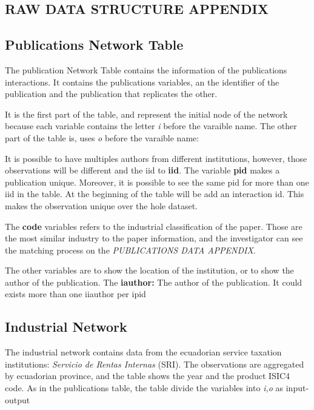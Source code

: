\documentclass[12pt]{article}
\begin{document}
\begin{center}
    \section*{RAW DATA STRUCTURE APPENDIX}
\end{center}

\subsection*{Publications Network Table}

The publication Network Table contains the information of
the publications interactions. It contains the publications
variables, an the identifier of the publication and 
the publication that replicates the other. 

It is the first part of the table, and represent the initial
node of the network because each variable contains the 
letter \textit{i} before the varaible name. The other part of
the table is, uses \textit{o} before the varaible name:

It is possible to have multiples authors from different
institutions, however, those observations will be different
and the iid to \textbf{iid}. The variable \textbf{pid} makes
a publication unique. Moreover, it is possible to see the
same pid for more than one iid in the table. At the
beginning of the table will be add an interaction id.
This makes the observation unique over the hole dataset.

The \textbf{code} variables refers to the industrial
classification of the paper. Those are the most similar
industry to the paper information, and the investigator 
can see the matching process on the \textit{PUBLICATIONS
DATA APPENDIX}.

The other variables are to show the location of the
institution, or to show the author of the publication. The
\textbf{iauthor:} The author of the publication. It could 
exists more than one iiauthor per ipid

\subsection*{Industrial Network}

The industrial network contains data from the ecuadorian 
service taxation institutions:
\textit{Servicio de Rentas Internas} (SRI). The observations
are aggregated by ecuadorian province, and the table shows
the year and the product ISIC4 code. As in the publications
table, the table divide the variables into \textit{i,o} as
input-output
\end{document}
